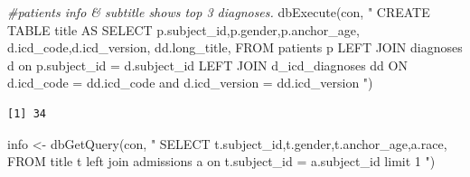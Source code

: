 \documentclass[
]{article}
\newenvironment{Shaded}{\begin{snugshade}}{\end{snugshade}}
\newcommand{\CommentTok}[1]{\textcolor[rgb]{0.56,0.35,0.01}{\textit{#1}}}
\newcommand{\FunctionTok}[1]{\textcolor[rgb]{0.00,0.00,0.00}{#1}}
\newcommand{\NormalTok}[1]{\textcolor[rgb]{0.00,0.00,0.00}{#1}}
\newcommand{\OtherTok}[1]{\textcolor[rgb]{0.56,0.35,0.01}{#1}}
\newcommand{\SpecialCharTok}[1]{\textcolor[rgb]{0.00,0.00,0.00}{#1}}
\newcommand{\StringTok}[1]{\textcolor[rgb]{0.31,0.60,0.02}{#1}}
\begin{document}
\begin{Shaded}
\begin{Highlighting}[]
\CommentTok{\#patients info \& subtitle shows top 3 diagnoses.}
\FunctionTok{dbExecute}\NormalTok{(con, }\StringTok{"}
\StringTok{  CREATE TABLE title AS}
\StringTok{  SELECT }
\StringTok{    p.subject\_id,p.gender,p.anchor\_age,}
\StringTok{    d.icd\_code,d.icd\_version,}
\StringTok{    dd.long\_title, }
\StringTok{  FROM patients p}
\StringTok{  LEFT JOIN diagnoses d }
\StringTok{  on p.subject\_id = d.subject\_id }
\StringTok{  LEFT JOIN d\_icd\_diagnoses dd}
\StringTok{  ON d.icd\_code = dd.icd\_code and d.icd\_version = dd.icd\_version}
\StringTok{"}\NormalTok{)}
\end{Highlighting}
\end{Shaded}

\begin{verbatim}
[1] 34
\end{verbatim}

\begin{Shaded}
\begin{Highlighting}[]
\NormalTok{info }\OtherTok{\textless{}{-}} \FunctionTok{dbGetQuery}\NormalTok{(con, }\StringTok{"}
\StringTok{  SELECT t.subject\_id,t.gender,t.anchor\_age,a.race,}
\StringTok{  FROM title t}
\StringTok{  left join admissions a}
\StringTok{  on t.subject\_id = a.subject\_id}
\StringTok{  limit 1}
\StringTok{"}\NormalTok{)}
\end{Highlighting}
\end{Shaded}

\begin{Shaded}
\end{Shaded}
\end{document}
